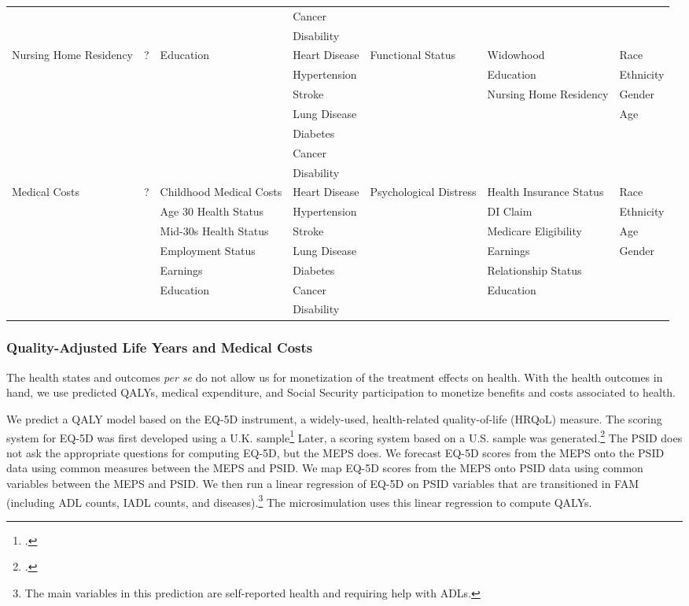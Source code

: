\begin{table}
\begin{tiny}
\begin{tabular}{lllllll}
& & & Cancer & & & \\
& & & Disability & & & \\
\midrule
Nursing Home Residency & ? & Education & Heart Disease & Functional Status & Widowhood & Race \\
& & & Hypertension & & Education & Ethnicity \\
& & & Stroke & &  Nursing Home Residency & Gender \\
& & & Lung Disease  & & & Age \\
&  & & Diabetes & & & \\
&  & & Cancer & & & \\
&  & & Disability & & & \\
\midrule
Medical Costs & ? & Childhood Medical Costs & Heart Disease & Psychological Distress & Health Insurance Status & Race \\
& & Age 30 Health Status  & Hypertension & & DI Claim & Ethnicity \\
& & Mid-30s Health Status & Stroke & & Medicare Eligibility & Age \\
& & Employment Status & Lung Disease & & Earnings & Gender \\
& & Earnings  & Diabetes & & Relationship Status &  \\
& & Education & Cancer & & Education  & \\
& & & Disability & & & \\
\bottomrule
\end{tabular}
\end{tiny}
\end{table}

\subsubsection{Quality-Adjusted Life Years and Medical Costs} \label{section:qalys}

\noindent The health states and outcomes \textit{per se} do not allow us for monetization of the treatment effects on health. With the health outcomes in hand, we use predicted QALYs, medical expenditure, and Social Security participation to monetize benefits and costs associated to health.

We predict a QALY model based on the EQ-5D instrument, a widely-used, health-related quality-of-life (HRQoL) measure. The scoring system for EQ-5D was first developed using a U.K. sample\footnote{\citet{Dolan_1997_Modeling_MC}.} Later, a scoring system based on a U.S. sample was generated.\footnote{\citet{Shaw_etal_2005_EQ5D_MC}.} The PSID does not ask the appropriate questions for computing EQ-5D, but the MEPS does. We forecast EQ-5D scores from the MEPS onto the PSID data using common measures between the MEPS and PSID. We map EQ-5D scores from the MEPS onto PSID data using common variables between the MEPS and PSID. We then run a linear regression of EQ-5D on PSID variables that are transitioned in FAM (including ADL counts, IADL counts, and diseases).\footnote{The main variables in this prediction are self-reported health and requiring help with ADLs.} The microsimulation uses this linear regression to compute QALYs.

